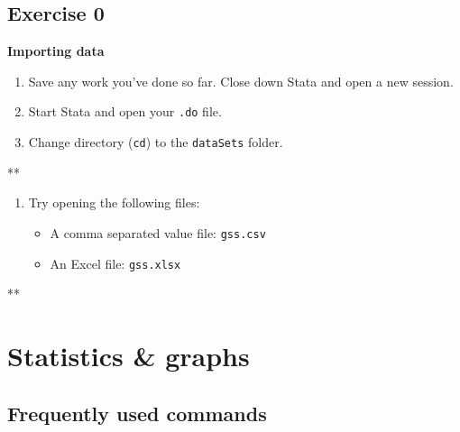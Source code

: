 \documentclass[
]{book}
\newenvironment{Shaded}{\begin{snugshade}}{\end{snugshade}}
\newcommand{\NormalTok}[1]{#1}
\providecommand{\tightlist}{%
  \setlength{\itemsep}{0pt}\setlength{\parskip}{0pt}}
\begin{document}
\hypertarget{exercise-0-5}{%
\subsection{Exercise 0}\label{exercise-0-5}}

\textbf{Importing data}

\begin{enumerate}
\def\labelenumi{\arabic{enumi}.}
\item
  Save any work you've done so far. Close down Stata and open a new session.
\item
  Start Stata and open your \texttt{.do} file.
\item
  Change directory (\texttt{cd}) to the \texttt{dataSets} folder.
\end{enumerate}

\begin{Shaded}
\begin{Highlighting}[]
\NormalTok{**}
\end{Highlighting}
\end{Shaded}

\begin{enumerate}
\def\labelenumi{\arabic{enumi}.}
\setcounter{enumi}{3}
\tightlist
\item
  Try opening the following files:

  \begin{itemize}
  \tightlist
  \item
    A comma separated value file: \texttt{gss.csv}
  \item
    An Excel file: \texttt{gss.xlsx}
  \end{itemize}
\end{enumerate}

\begin{Shaded}
\begin{Highlighting}[]
\NormalTok{**}
\end{Highlighting}
\end{Shaded}

\hypertarget{statistics-graphs}{%
\section{Statistics \& graphs}\label{statistics-graphs}}

\hypertarget{frequently-used-commands}{%
\subsection{Frequently used commands}\label{frequently-used-commands}}
\end{document}
